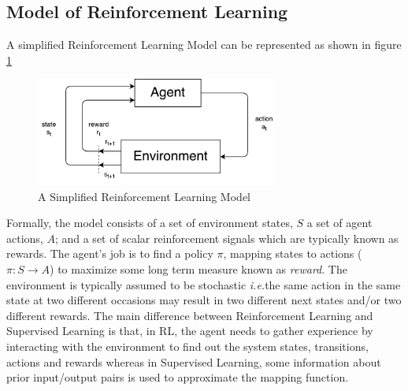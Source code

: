 \documentclass[12pt]{report}
\newcommand{\ie}{\textit{i.e.}}
\begin{document}
\subsection{Model of Reinforcement Learning}
A simplified Reinforcement Learning Model can be represented as shown in figure \ref{fig:rl_model}
\begin{figure}[htp]
	\centering
	\includegraphics[width=8cm]{rl_model.pdf}
	\caption {A Simplified Reinforcement Learning Model}
   \label{fig:rl_model}
\end{figure}
Formally, the model consists of a set of environment states, $S$
a set of agent actions, $A$; and a set of scalar reinforcement signals which are typically known as rewards. The agent's job is to find a policy $\pi$, mapping states to actions ( $\pi: S \rightarrow A$) to maximize some long term measure known as \textit{reward}. The environment is typically assumed to be stochastic \ie the same action in the same state at two different occasions may result in two different next states and/or two different rewards. The main difference between Reinforcement Learning and Supervised Learning is that, in RL, the agent needs to gather experience by interacting with the environment to find out the system states, transitions, actions and rewards whereas in Supervised Learning, some information about prior input/output pairs is used to approximate the mapping function.
\end{document}
